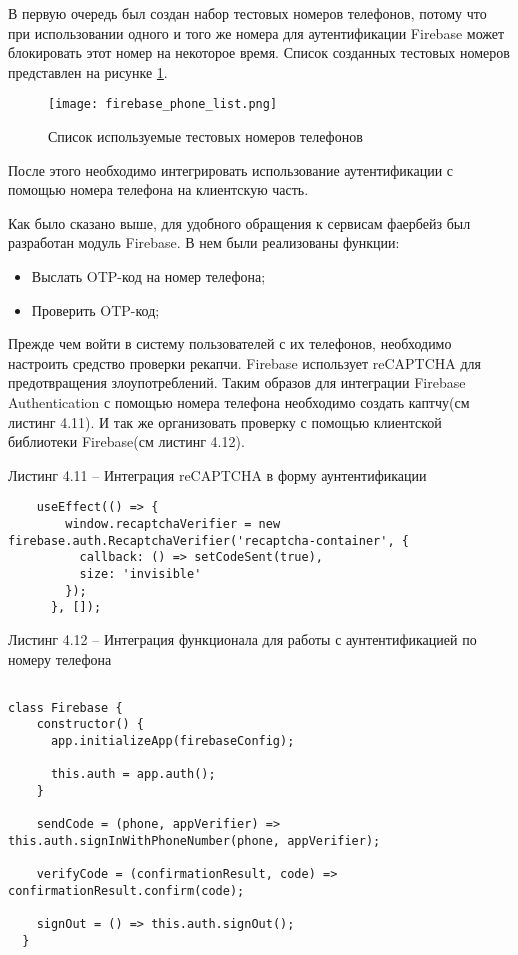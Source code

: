 В первую очередь был создан набор тестовых номеров телефонов, потому что при использовании одного и того же номера для аутентификации Firebase может блокировать этот номер на некоторое время.
Список созданных тестовых номеров представлен на рисунке \ref{fire:phones}.
\begin{figure}[ht]
    \centering
    \texttt{[image: firebase\_phone\_list.png]}
    \caption{ Список используемые тестовых номеров телефонов }
    \label{fire:phones}
\end{figure}

После этого необходимо интегрировать использование аутентификации с помощью номера телефона на клиентскую часть.

Как было сказано выше, для удобного обращения к сервисам фаербейз был разработан модуль Firebase.
В нем были реализованы функции:
\begin{itemize}
    \item Выслать OTP-код на номер телефона;
    \item Проверить OTP-код;
\end{itemize}

Прежде чем войти в систему пользователей с их телефонов, необходимо настроить средство проверки рекапчи.
Firebase использует reCAPTCHA для предотвращения злоупотреблений.
Таким образов для интеграции Firebase Authentication с помощью номера телефона необходимо создать каптчу(см листинг 4.11).
И так же организовать проверку с помощью клиентской библиотеки Firebase(см листинг 4.12).


Листинг 4.11 – Интеграция reCAPTCHA в форму аунтентификации
\begin{lstlisting}
    useEffect(() => {
        window.recaptchaVerifier = new firebase.auth.RecaptchaVerifier('recaptcha-container', {
          callback: () => setCodeSent(true),
          size: 'invisible'
        });
      }, []);
\end{lstlisting}

Листинг 4.12 – Интеграция функционала для работы с аунтентификацией по номеру телефона
\begin{lstlisting}

class Firebase {
    constructor() {
      app.initializeApp(firebaseConfig);

      this.auth = app.auth();
    }

    sendCode = (phone, appVerifier) => this.auth.signInWithPhoneNumber(phone, appVerifier);

    verifyCode = (confirmationResult, code) => confirmationResult.confirm(code);

    signOut = () => this.auth.signOut();
  }

\end{lstlisting}

